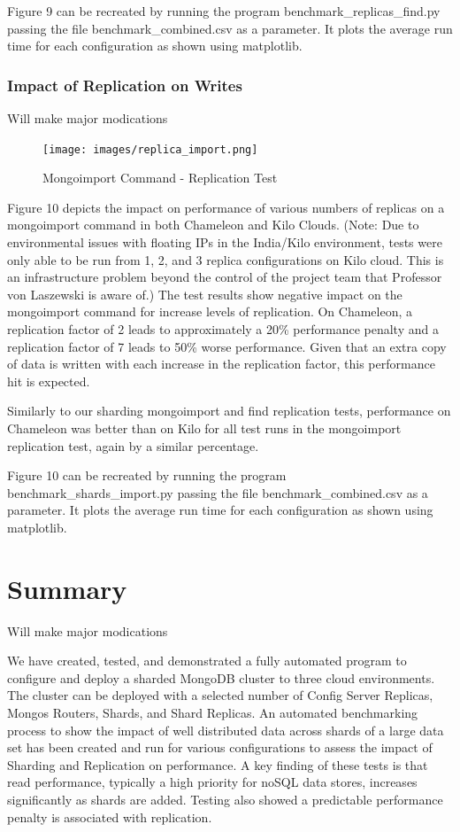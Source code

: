 \documentclass[9pt,twocolumn,twoside]{../../styles/osajnl}
\begin{document}
Figure 9 can be recreated by running the program benchmark\_replicas\_find.py passing the file benchmark\_combined.csv as a parameter.  It plots the average run time for each configuration as shown using matplotlib.



\subsubsection{Impact of Replication on Writes}

Will make major modications

\begin{figure}[!ht]
  \texttt{[image: images/replica\_import.png]}
  \caption{Mongoimport Command - Replication Test}
\end{figure}


Figure 10 depicts the impact on performance of various numbers of replicas on a mongoimport command in both Chameleon and Kilo Clouds.  (Note: Due to environmental issues with floating IPs in the India/Kilo environment, tests were only able to be run from 1, 2, and 3 replica configurations on Kilo cloud.  This is an infrastructure problem beyond the control of the project team that Professor von Laszewski is aware of.)  The test results show negative impact on the mongoimport command for increase levels of replication.  On Chameleon, a replication factor of 2 leads to approximately a 20\% performance penalty and a replication factor of 7 leads to 50\% worse performance.  Given that an extra copy of data is written with each increase in the replication factor, this performance hit is expected.  

Similarly to our sharding mongoimport and find replication tests, performance on Chameleon was better than on Kilo for all test runs in the mongoimport replication test, again by a similar percentage.

Figure 10 can be recreated by running the program benchmark\_shards\_import.py passing the file benchmark\_combined.csv as a parameter.  It plots the average run time for each configuration as shown using matplotlib.



\section{Summary}

Will make major modications

We have created, tested, and demonstrated a fully automated program to configure and deploy a sharded MongoDB cluster to three cloud environments.  The cluster can be deployed with a selected number of Config Server Replicas, Mongos Routers, Shards, and Shard Replicas.  An automated benchmarking process to show the impact of well distributed data across shards of a large data set has been created and run for various configurations to assess the impact of Sharding and Replication on performance.  A key finding of these tests is that read performance, typically a high priority for noSQL data stores, increases significantly as shards are added.  Testing also showed a predictable performance penalty is associated with replication.
\end{document}
